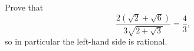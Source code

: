 Prove that
\[\dfrac{2\left(\sqrt2+\sqrt6\right)}{3\sqrt{2+\sqrt3}}=\dfrac{4}{3},\]
so in particular the left-hand side is rational.
